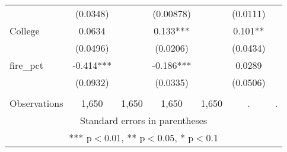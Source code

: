 \begin{tabular}{lcccccc}
 & (0.0348) &  & (0.00878) &  & (0.0111) &  \\
College & 0.0634 &  & 0.133*** &  & 0.101** &  \\
 & (0.0496) &  & (0.0206) &  & (0.0434) &  \\
fire\_pct & -0.414*** &  & -0.186*** &  & 0.0289 &  \\
 & (0.0932) &  & (0.0335) &  & (0.0506) &  \\
 &  &  &  &  &  &  \\
 Observations & 1,650 & 1,650 & 1,650 & 1,650 & . & . \\ \hline
\multicolumn{7}{c}{ Standard errors in parentheses} \\
\multicolumn{7}{c}{ *** p$<$0.01, ** p$<$0.05, * p$<$0.1} \\
\end{tabular}
